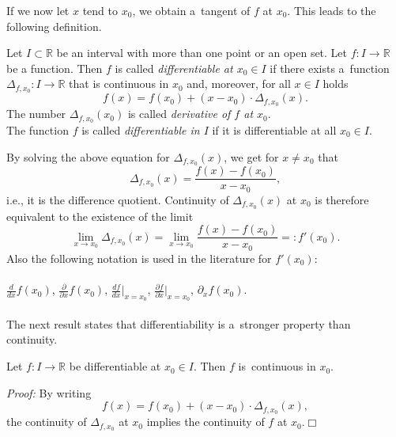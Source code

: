 If we now let $x$ tend to $x_0$, we obtain a~tangent of $f$ at $x_0$. This leads to the following definition.
\begin{Definition}{}\label{def:diff}
    Let $I\subset\mathbb{R}$ be an interval with more than one point or
    an open set. Let $f:I\to\mathbb{R}$ be a function. Then $f$ is called \emph{differentiable at $x_0\in I$} if there exists a~function $\Delta_{f,x_0}:I\to\mathbb{R}$ that is continuous in $x_0$ and, moreover, for all $x\in I$ holds
\[f(x)=f(x_0)+(x-x_0)\cdot\Delta_{f,x_0}(x).\]
The number $\Delta_{f,x_0}(x_0)$ is called \emph{derivative of $f$ at $x_0$}.\\
The function $f$ is called \emph{differentiable in $I$} if it is differentiable at all $x_0\in I$.
\end{Definition}
By solving the above equation for $\Delta_{f,x_0}(x)$, we get for $x\neq x_0$ that
\[\Delta_{f,x_0}(x)=\frac{f(x)-f(x_0)}{x-x_0},\]
i.e., it is the difference quotient. Continuity of $\Delta_{f,x_0}(x)$ at $x_0$ is therefore equivalent to the existence of the limit
\[\lim_{x\to x_0}\Delta_{f,x_0}(x)=\lim_{x\to x_0}\frac{f(x)-f(x_0)}{x-x_0}=:f'(x_0).\]
Also the following notation is used in the literature for $f'(x_0)$:
\\ \\
$\frac{d}{dx}f(x_0)$, $\frac{\partial}{\partial x}f(x_0)$, $\frac{d f}{d x}|_{x=x_0}$, $\frac{\partial f}{\partial x}|_{x=x_0}$,
$\partial_xf(x_0)$.
\\ \\

The next result states that differentiability is a~stronger property than continuity.

\begin{Theorem}{}\label{th:diffcont}
    Let $f:I\to\mathbb{R}$ be differentiable at $x_0\in I$. Then $f$ is~continuous in $x_0$.
\end{Theorem}
{\em Proof:} By writing
\[f(x)=f(x_0)+(x-x_0)\cdot\Delta_{f,x_0}(x),\]
the continuity of $\Delta_{f,x_0}$ at $x_0$ implies the continuity of $f$ at $x_0$.\hfill$\Box$


